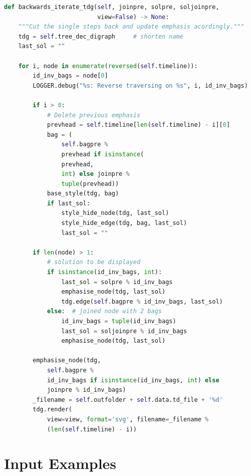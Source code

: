 \documentclass[a4paper, 12pt]{scrartcl}
\begin{document}
\begin{lstlisting}[language={Python}, caption={backwards\_iterate\_tdg}, label={lst:backward-iterate}]
def backwards_iterate_tdg(self, joinpre, solpre, soljoinpre,
                          view=False) -> None:
	"""Cut the single steps back and update emphasis acordingly."""
	tdg = self.tree_dec_digraph     # shorten name
	last_sol = ""
	
	for i, node in enumerate(reversed(self.timeline)):
		id_inv_bags = node[0]
		LOGGER.debug("%s: Reverse traversing on %s", i, id_inv_bags)
		
		if i > 0:
			# Delete previous emphasis
			prevhead = self.timeline[len(self.timeline) - i][0]
			bag = (
				self.bagpre %
				prevhead if isinstance(
				prevhead,
				int) else joinpre %
				tuple(prevhead))
			base_style(tdg, bag)
			if last_sol:
				style_hide_node(tdg, last_sol)
				style_hide_edge(tdg, bag, last_sol)
				last_sol = ""
		
		if len(node) > 1:
			# solution to be displayed
			if isinstance(id_inv_bags, int):
				last_sol = solpre % id_inv_bags
				emphasise_node(tdg, last_sol)
				tdg.edge(self.bagpre % id_inv_bags, last_sol)
			else:  # joined node with 2 bags
				id_inv_bags = tuple(id_inv_bags)
				last_sol = soljoinpre % id_inv_bags
				emphasise_node(tdg, last_sol)
			
		emphasise_node(tdg,
			self.bagpre %
			id_inv_bags if isinstance(id_inv_bags, int) else 
			joinpre % id_inv_bags)
		_filename = self.outfolder + self.data.td_file + '%d'
		tdg.render(
			view=view, format='svg', filename=_filename %
			(len(self.timeline) - i))

\end{lstlisting}

\section{Input Examples}
\end{document}
